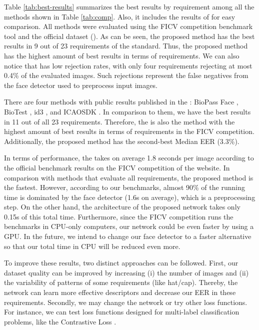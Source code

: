 

Table \ref{tab:best-results} summarizes the best results by requirement among all the methods shown in Table \ref{tab:comp}. Also, it includes the results of \methodname for easy comparison. All methods were evaluated using the FICV competition benchmark tool and the official dataset (\ficvofficial). As can be seen, the proposed method has the best results in 9 out of 23 requirements of the \icao standard. Thus, the proposed method has the highest amount of best results in terms of requirements. We can also notice that \methodname has low rejection rates, with only four requirements rejecting at most 0.4\% of the evaluated images. Such rejections represent the false negatives from the face detector used to preprocess input images.



There are four methods with public results published in the \fvcongoing: BioPass Face \citep{fvcVsoft}, BioTest \citep{fvcBioTest}, id3 \citep{fvcICAOCompliance}, and ICAOSDK \citep{fvcSeamfix}. In comparison to them, we have the best results in 11 out of all 23 requirements. Therefore, the \methodname is also the method with the highest amount of best results in terms of requirements in the FICV competition. Additionally, the proposed method has the second-best Median EER (3.3\%).

In terms of performance, the \methodname takes on average 1.8 seconds per image according to the official benchmark results on the FICV competition of the \fvcongoing website. In comparison with methods that evaluate all requirements, the proposed method is the fastest. However, according to our benchmarks, almost 90\% of the \methodname running time is dominated by the face detector (1.6s on average), which is a preprocessing step. On the other hand, the architecture of the proposed network takes only 0.15s of this total time. Furthermore, since the FICV competition runs the benchmarks in CPU-only computers, our network could be even faster by using a GPU. In the future, we intend to change our face detector to a faster alternative so that our total time in CPU will be reduced even more.

To improve these results, two distinct approaches can be followed. First, our dataset quality can be improved by increasing (i) the number of images and (ii) the variability of patterns of some requirements (like hat/cap). Thereby, the network can learn more effective descriptors and decrease our EER in these requirements. Secondly, we may change the network or try other loss functions. For instance, we can test loss functions designed for multi-label classification problems, like the Contrastive Loss \citep{khosla2020supervised}.

